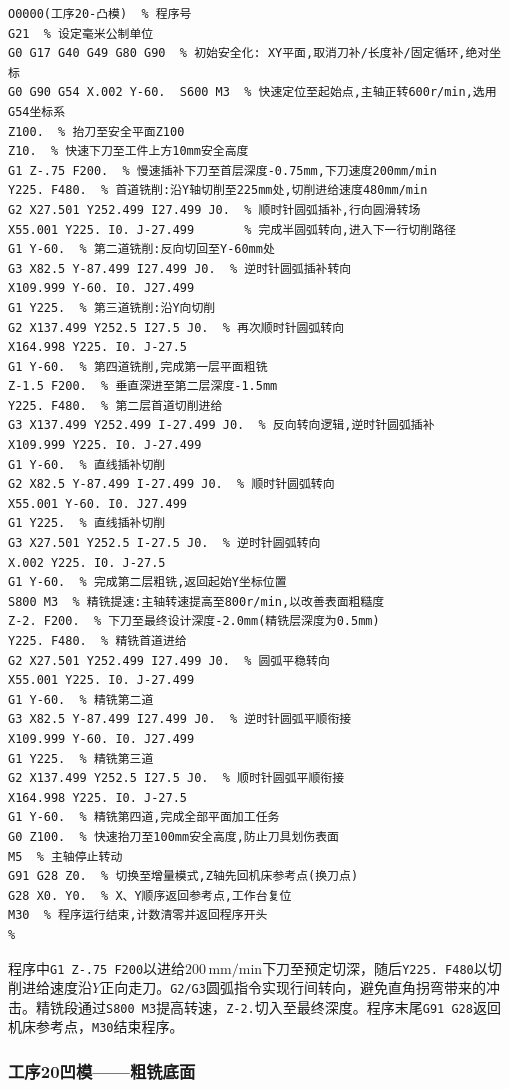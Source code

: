 \documentclass{xautCADreport}
\begin{document}
\begin{lstlisting}[caption={工序20凸模铣平面程序（完整程序）}]
%
O0000(工序20-凸模)  % 程序号
G21  % 设定毫米公制单位
G0 G17 G40 G49 G80 G90  % 初始安全化: XY平面,取消刀补/长度补/固定循环,绝对坐标
G0 G90 G54 X.002 Y-60.  S600 M3  % 快速定位至起始点,主轴正转600r/min,选用G54坐标系
Z100.  % 抬刀至安全平面Z100
Z10.  % 快速下刀至工件上方10mm安全高度
G1 Z-.75 F200.  % 慢速插补下刀至首层深度-0.75mm,下刀速度200mm/min
Y225. F480.  % 首道铣削:沿Y轴切削至225mm处,切削进给速度480mm/min
G2 X27.501 Y252.499 I27.499 J0.  % 顺时针圆弧插补,行向圆滑转场
X55.001 Y225. I0. J-27.499       % 完成半圆弧转向,进入下一行切削路径
G1 Y-60.  % 第二道铣削:反向切回至Y-60mm处
G3 X82.5 Y-87.499 I27.499 J0.  % 逆时针圆弧插补转向
X109.999 Y-60. I0. J27.499
G1 Y225.  % 第三道铣削:沿Y向切削
G2 X137.499 Y252.5 I27.5 J0.  % 再次顺时针圆弧转向
X164.998 Y225. I0. J-27.5
G1 Y-60.  % 第四道铣削,完成第一层平面粗铣
Z-1.5 F200.  % 垂直深进至第二层深度-1.5mm
Y225. F480.  % 第二层首道切削进给
G3 X137.499 Y252.499 I-27.499 J0.  % 反向转向逻辑,逆时针圆弧插补
X109.999 Y225. I0. J-27.499
G1 Y-60.  % 直线插补切削
G2 X82.5 Y-87.499 I-27.499 J0.  % 顺时针圆弧转向
X55.001 Y-60. I0. J27.499
G1 Y225.  % 直线插补切削
G3 X27.501 Y252.5 I-27.5 J0.  % 逆时针圆弧转向
X.002 Y225. I0. J-27.5
G1 Y-60.  % 完成第二层粗铣,返回起始Y坐标位置
S800 M3  % 精铣提速:主轴转速提高至800r/min,以改善表面粗糙度
Z-2. F200.  % 下刀至最终设计深度-2.0mm(精铣层深度为0.5mm)
Y225. F480.  % 精铣首道进给
G2 X27.501 Y252.499 I27.499 J0.  % 圆弧平稳转向
X55.001 Y225. I0. J-27.499
G1 Y-60.  % 精铣第二道
G3 X82.5 Y-87.499 I27.499 J0.  % 逆时针圆弧平顺衔接
X109.999 Y-60. I0. J27.499
G1 Y225.  % 精铣第三道
G2 X137.499 Y252.5 I27.5 J0.  % 顺时针圆弧平顺衔接
X164.998 Y225. I0. J-27.5
G1 Y-60.  % 精铣第四道,完成全部平面加工任务
G0 Z100.  % 快速抬刀至100mm安全高度,防止刀具划伤表面
M5  % 主轴停止转动
G91 G28 Z0.  % 切换至增量模式,Z轴先回机床参考点(换刀点)
G28 X0. Y0.  % X、Y顺序返回参考点,工作台复位
M30  % 程序运行结束,计数清零并返回程序开头
%
\end{lstlisting}

程序中\texttt{G1 Z-.75 F200}以进给$200\,\mathrm{mm/min}$下刀至预定切深，随后\texttt{Y225. F480}以切削进给速度沿$Y$正向走刀。\texttt{G2/G3}圆弧指令实现行间转向，避免直角拐弯带来的冲击。精铣段通过\texttt{S800 M3}提高转速，\texttt{Z-2.}切入至最终深度。程序末尾\texttt{G91 G28}返回机床参考点，\texttt{M30}结束程序。

\subsubsection{工序20凹模——粗铣底面}
\end{document}
